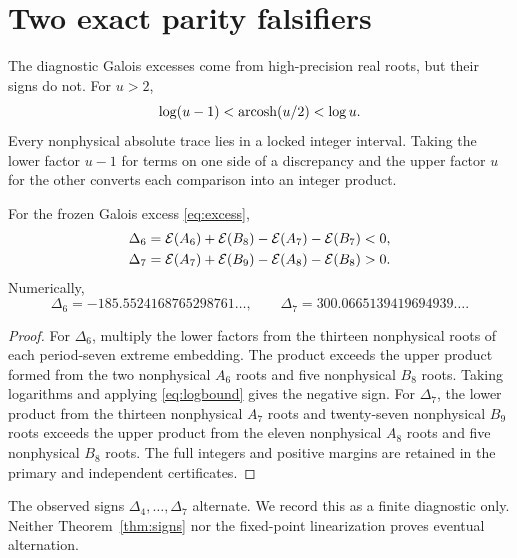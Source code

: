 \section{Two exact parity falsifiers}

The diagnostic Galois excesses come from high-precision real roots, but their
signs do not.  For $u>2$,
\begin{equation}
\log(u-1)<\operatorname{arcosh}(u/2)<\log u.
\label{eq:logbound}
\end{equation}
Every nonphysical absolute trace lies in a locked integer interval.  Taking
the lower factor $u-1$ for terms on one side of a discrepancy and the upper
factor $u$ for the other converts each comparison into an integer product.

\begin{theorem}
\label{thm:signs}
For the frozen Galois excess \eqref{eq:excess},
\begin{align}
\Delta_6
&=\mathcal E(A_6)+\mathcal E(B_8)-\mathcal E(A_7)-\mathcal E(B_7)<0,\\
\Delta_7
&=\mathcal E(A_7)+\mathcal E(B_9)-\mathcal E(A_8)-\mathcal E(B_8)>0.
\end{align}
Numerically,
\[
\Delta_6=-185.5524168765298761\ldots,
\qquad
\Delta_7=300.0665139419694939\ldots.
\]
\end{theorem}

\begin{proof}
For \(\Delta_6\), multiply the lower factors from the thirteen nonphysical
roots of each period-seven extreme embedding.  The product exceeds the upper
product formed from the two nonphysical $A_6$ roots and five nonphysical
$B_8$ roots.  Taking logarithms and applying \eqref{eq:logbound} gives the
negative sign.  For \(\Delta_7\), the lower product from the thirteen
nonphysical $A_7$ roots and twenty-seven nonphysical $B_9$ roots exceeds the
upper product from the eleven nonphysical $A_8$ roots and five nonphysical
$B_8$ roots.  The full integers and positive margins are retained in the
primary and independent certificates.
\end{proof}

The observed signs \(\Delta_4,\ldots,\Delta_7\) alternate.  We record this as
a finite diagnostic only.  Neither Theorem~\ref{thm:signs} nor the fixed-point
linearization proves eventual alternation.

